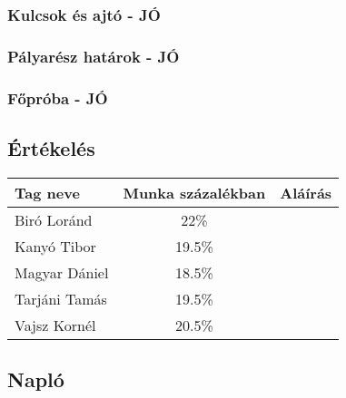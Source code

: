 \subsubsection{Kulcsok és ajtó - JÓ}

\begin{usecase}
\end{usecase}

\subsubsection{Pályarész határok - JÓ}

\begin{usecase}
\end{usecase}

\subsubsection{Főpróba - JÓ}

\begin{usecase}
\end{usecase}


\subsection{Értékelés}
\begin{tabular}{|p{130pt}|c|p{150pt}|}
\hline 
\textbf{Tag neve} & \textbf{Munka százalékban} & \textbf{Aláírás}\\ 
\hline 
Biró Loránd & 22\% & \\ 
\hline 
Kanyó Tibor & 19.5\% & \\
\hline 
Magyar Dániel & 18.5\% & \\
\hline 
Tarjáni Tamás & 19.5\% & \\
\hline 
Vajsz Kornél & 20.5\% & \\
\hline 
\end{tabular} 
\newpage

\subsection{Napló}

